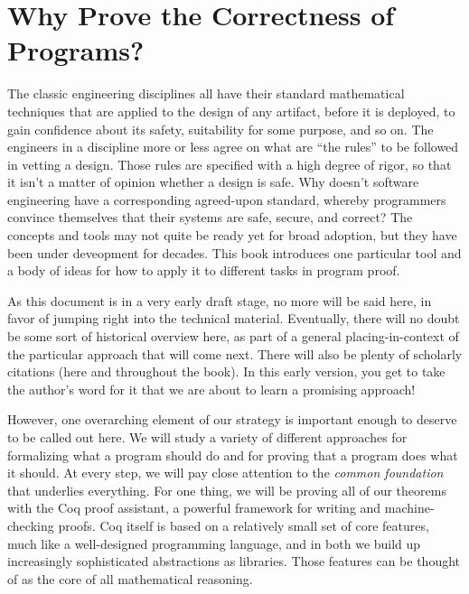 \documentclass{amsbook}
\theoremstyle{definition}
\theoremstyle{remark}
\numberwithin{section}{chapter}
\numberwithin{equation}{chapter}
\begin{document}
\setcounter{page}{4}

\tableofcontents

\mainmatter


\chapter{Why Prove the Correctness of Programs?}

The classic engineering disciplines all have their standard mathematical techniques that are applied to the design of any artifact, before it is deployed, to gain confidence about its safety, suitability for some purpose, and so on.
The engineers in a discipline more or less agree on what are ``the rules'' to be followed in vetting a design.
Those rules are specified with a high degree of rigor, so that it isn't a matter of opinion whether a design is safe.
Why doesn't software engineering have a corresponding agreed-upon standard, whereby programmers convince themselves that their systems are safe, secure, and correct?
The concepts and tools may not quite be ready yet for broad adoption, but they have been under deveopment for decades.
This book introduces one particular tool and a body of ideas for how to apply it to different tasks in program proof.

As this document is in a very early draft stage, no more will be said here, in favor of jumping right into the technical material.
Eventually, there will no doubt be some sort of historical overview here, as part of a general placing-in-context of the particular approach that will come next.
There will also be plenty of scholarly citations (here and throughout the book).
In this early version, you get to take the author's word for it that we are about to learn a promising approach!

However, one overarching element of our strategy is important enough to deserve to be called out here.
We will study a variety of different approaches for formalizing what a program should do and for proving that a program does what it should.
At every step, we will pay close attention to the \emph{common foundation} that underlies everything.
For one thing, we will be proving all of our theorems with the Coq proof assistant, a powerful framework for writing and machine-checking proofs.
Coq itself is based on a relatively small set of core features, much like a well-designed programming language, and in both we build up increasingly sophisticated abstractions as libraries.
Those features can be thought of as the core of all mathematical reasoning.
\end{document}
